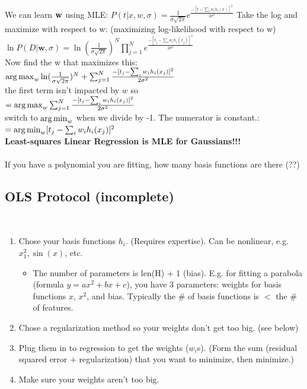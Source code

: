 We can learn $\bf{w}$ using MLE: 
$P(t | x, w, \sigma) = \frac{1}{\sigma \sqrt{2 \pi}} e^\frac{-[t - \sum_i w_i h_i(x)]^2}{2 \sigma^2}$
Take the log and maximize with respect to w:  (maximizing log-likelihood with respect to w) \hfill \\
$\displaystyle \ln P(D | \bm{w}, \sigma) = \ln(\frac{1}{\sigma \sqrt{2 \pi}})^N \prod_{j=1}^N e^\frac{-[t_j - \sum_i w_i h_i(x_j)]^2}{2 \sigma^2}$ \hfill \\
Now find the w that maximizes this: \hfill \\
$\operatorname*{arg\,max}_w \ln(\frac{1}{\sigma \sqrt{2 \pi}})^N + \sum_{j=1}^N \frac{-[t_j - \sum_i w_i h_i(x_j)]^2}{2 \sigma^2}$ \hfill \\
the first term isn't impacted by $w$ so  \hfill \\
$= \operatorname*{arg\,max}_w  \sum_{j=1}^N \frac{-[t_j - \sum_i w_i h_i(x_j)]^2}{2 \sigma^2}$ \hfill \\
switch to $\operatorname*{arg\,min}_w$ when we divide by -1.  The numerator is constant.:  \hfill \\
$= \operatorname*{arg\,min}_w  [t_j - \sum_i w_i h_i(x_j)]^2 $ \hfill \\

\textbf{Least-squares Linear Regression is MLE for Gaussians!!!}  \hfill \\ \hfill \\

If you have a polynomial you are fitting, how many basis functions are there (??)  \hfill \\ %


\subsection{OLS Protocol (incomplete)}  \hfill \\
\begin{enumerate}
	\item Chose your basis functions $h_i$.  (Requires expertise).  Can be nonlinear, e.g. $x_1^2, \sin(x)$, etc. 
		\begin {itemize}
			\item 
				The number of parameters is len(H) + 1 (bias).  
				E.g. for fitting a parabola (formula $y = ax^2 + bx + c$), 
				you have 3 parameters: weights for basis functions $x$, $x^2$, and bias. 
				Typically the \# of basis functions is $<$ the \# of features.
		\end {itemize}
	\item Chose a regularization method so your weights don't get too big.  (see below)
	\item Plug them in to regression to get the weights ($w_i$s).  (Form the sum (residual squared error + regularization) that you want to minimize, then minimize.)    
	\item Make sure your weights aren't too big. 
	
\end{enumerate}

